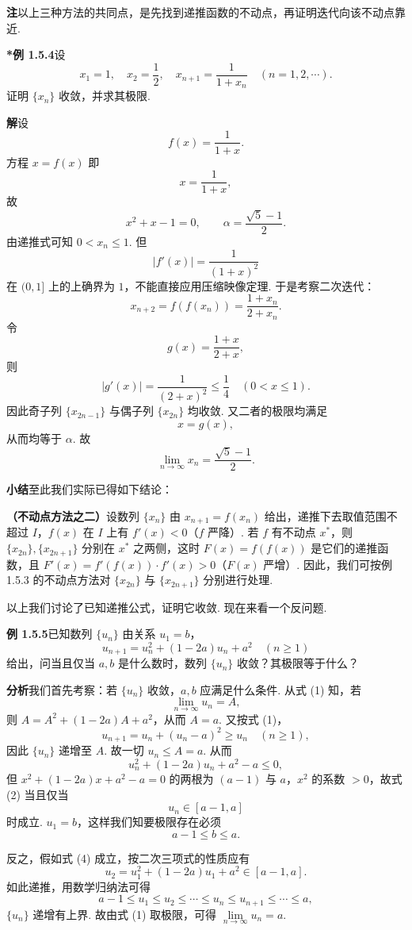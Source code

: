 \documentclass[UTF8,12pt,a4paper,fontset=fandol]{ctexart}
\begin{document}
\noindent\textbf{注}\quad 以上三种方法的共同点，是先找到递推函数的不动点，再证明迭代向该不动点靠近.

\noindent\textbf{*例 1.5.4}\quad 设
\[
  x_1=1,\quad x_2=\frac12,\quad
  x_{n+1}=\frac{1}{1+x_n}\quad (n=1,2,\cdots).
\]
证明 $\{x_n\}$ 收敛，并求其极限.

\noindent\textbf{解}\quad 设
\[
  f(x)=\frac{1}{1+x}.
\]
方程 $x=f(x)$ 即
\[
  x=\frac1{1+x},
\]
故
\[
  x^2+x-1=0,\qquad
  \alpha=\frac{\sqrt5-1}{2}.
\]
由递推式可知 $0<x_n\le 1$. 但
\[
  |f'(x)|=\frac{1}{(1+x)^2}
\]
在 $(0,1]$ 上的上确界为 $1$，不能直接应用压缩映像定理. 于是考察二次迭代：
\[
  x_{n+2}=f(f(x_n))=\frac{1+x_n}{2+x_n}.
\]
令
\[
  g(x)=\frac{1+x}{2+x},
\]
则
\[
  |g'(x)|=\frac{1}{(2+x)^2}\le \frac14\quad (0<x\le 1).
\]
因此奇子列 $\{x_{2n-1}\}$ 与偶子列 $\{x_{2n}\}$ 均收敛. 又二者的极限均满足
\[
  x=g(x),
\]
从而均等于 $\alpha$. 故
\[
  \lim_{n\to\infty}x_n=\frac{\sqrt5-1}{2}.
\]

\noindent\textbf{小结}\quad 至此我们实际已得如下结论：

\noindent\textbf{（不动点方法之二）}\quad 设数列 $\{x_n\}$ 由 $x_{n+1}=f(x_n)$ 给出，递推下去取值范围不超过 $I$，$f(x)$ 在 $I$ 上有 $f'(x)<0$（$f$ 严降）. 若 $f$ 有不动点 $x^*$，则 $\{x_{2n}\},\{x_{2n+1}\}$ 分别在 $x^*$ 之两侧，这时 $F(x)=f(f(x))$ 是它们的递推函数，且 $F'(x)=f'(f(x))\cdot f'(x)>0$（$F(x)$ 严增）. 因此，我们可按例 1.5.3 的不动点方法对 $\{x_{2n}\}$ 与 $\{x_{2n+1}\}$ 分别进行处理.

以上我们讨论了已知递推公式，证明它收敛. 现在来看一个反问题.

\noindent\textbf{例 1.5.5}\quad 已知数列 $\{u_n\}$ 由关系 $u_1=b$，
\[
  u_{n+1}=u_n^2+(1-2a)u_n+a^2\quad (n\ge 1)
\tag{1}
\]
给出，问当且仅当 $a,b$ 是什么数时，数列 $\{u_n\}$ 收敛？其极限等于什么？

\noindent\textbf{分析}\quad 我们首先考察：若 $\{u_n\}$ 收敛，$a,b$ 应满足什么条件. 从式 (1) 知，若
\[
  \lim_{n\to\infty}u_n=A,
\]
则 $A=A^2+(1-2a)A+a^2$，从而 $A=a$. 又按式 (1)，
\[
  u_{n+1}=u_n+(u_n-a)^2\ge u_n\quad (n\ge 1),
\]
因此 $\{u_n\}$ 递增至 $A$. 故一切 $u_n\le A=a$. 从而
\[
  u_n^2+(1-2a)u_n+a^2-a\le 0,
\tag{2}
\]
但 $x^2+(1-2a)x+a^2-a=0$ 的两根为 $(a-1)$ 与 $a$，$x^2$ 的系数 $>0$，故式 (2) 当且仅当
\[
  u_n\in [a-1,a]
\tag{3}
\]
时成立. $u_1=b$，这样我们知要极限存在必须
\[
  a-1\le b\le a.
\tag{4}
\]

反之，假如式 (4) 成立，按二次三项式的性质应有
\[
  u_2=u_1^2+(1-2a)u_1+a^2\in [a-1,a].
\]
如此递推，用数学归纳法可得
\[
  a-1\le u_1\le u_2\le \cdots \le u_n\le u_{n+1}\le \cdots \le a,
\]
$\{u_n\}$ 递增有上界. 故由式 (1) 取极限，可得 $\lim\limits_{n\to\infty}u_n=a$.
\end{document}
